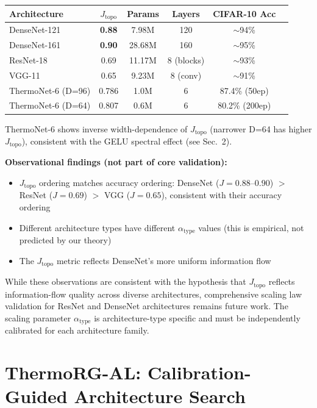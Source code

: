 \documentclass[11pt, a4paper]{article}
\theoremstyle{plain}
\begin{document}
\begin{center}
\begin{tabular}{lccccc}
\toprule
Architecture & $J_{\mathrm{topo}}$ & Params & Layers & CIFAR-10 Acc \\
\midrule
DenseNet-121 & \textbf{0.88} & 7.98M & 120 & $\sim$94\% \\
DenseNet-161 & \textbf{0.90} & 28.68M & 160 & $\sim$95\% \\
ResNet-18 & 0.69 & 11.17M & 8 (blocks) & $\sim$93\% \\
VGG-11 & 0.65 & 9.23M & 8 (conv) & $\sim$91\% \\
ThermoNet-6 (D=96) & 0.786 & 1.0M & 6 & 87.4\% (50ep) \\
ThermoNet-6 (D=64) & 0.807 & 0.6M & 6 & 80.2\% (200ep) \\
\bottomrule
\end{tabular}
\end{center}
{\small * ThermoNet-6 shows inverse width-dependence of $J_{\mathrm{topo}}$ (narrower D=64 has higher $J_{\mathrm{topo}}$), consistent with the GELU spectral effect (see Sec.~2).}

\textbf{Observational findings (not part of core validation):}
\begin{itemize}
\item $J_{\mathrm{topo}}$ ordering matches accuracy ordering: DenseNet ($J=0.88$--$0.90$) $>$ ResNet ($J=0.69$) $>$ VGG ($J=0.65$), consistent with their accuracy ordering
\item Different architecture types have different $\alpha_{\mathrm{type}}$ values (this is empirical, not predicted by our theory)
\item The $J_{\mathrm{topo}}$ metric reflects DenseNet's more uniform information flow
\end{itemize}

While these observations are consistent with the hypothesis that $J_{\mathrm{topo}}$ reflects information-flow quality across diverse architectures, comprehensive scaling law validation for ResNet and DenseNet architectures remains future work. The scaling parameter $\alpha_{\mathrm{type}}$ is architecture-type specific and must be independently calibrated for each architecture family.

\section{ThermoRG-AL: Calibration-Guided Architecture Search}\label{sec:thermorg-al}
\end{document}
